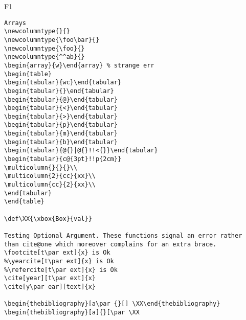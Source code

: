 \documentclass{article}
\begin{document}
\begin{filecontents+}{F1}
\begin{Verbatim}
Arrays
\newcolumntype{}{}
\newcolumntype{\foo\bar}{}
\newcolumntype{\foo}{}
\newcolumntype{^^ab}{}
\begin{array}{w}\end{array} % strange err
\begin{table}
\begin{tabular}{wc}\end{tabular}
\begin{tabular}{}\end{tabular}
\begin{tabular}{@}\end{tabular}
\begin{tabular}{<}\end{tabular}
\begin{tabular}{>}\end{tabular}
\begin{tabular}{p}\end{tabular}
\begin{tabular}{m}\end{tabular}
\begin{tabular}{b}\end{tabular}
\begin{tabular}{@{}|@{}!!<{}}\end{tabular}
\begin{tabular}{c@{3pt}!!p{2cm}}
\multicolumn{}{}{}\\
\multicolumn{2}{cc}{xx}\\
\multicolumn{cc}{2}{xx}\\
\end{tabular}
\end{table}

\def\XX{\xbox{Box}{val}}

Testing Optional Argument. These functions signal an error rather
than cite@one which moreover complains for an extra brace.
\footcite[t\par ext]{x} is Ok 
%\yearcite[t\par ext]{x} is Ok
%\refercite[t\par ext]{x} is Ok
\cite[year][t\par ext]{x}
\cite[y\par ear][text]{x}

\begin{thebibliography}[a\par {}[] \XX\end{thebibliography}
\begin{thebibliography}[a]{}[\par \XX


\end{Verbatim}
\end{filecontents+}
\end{document}
